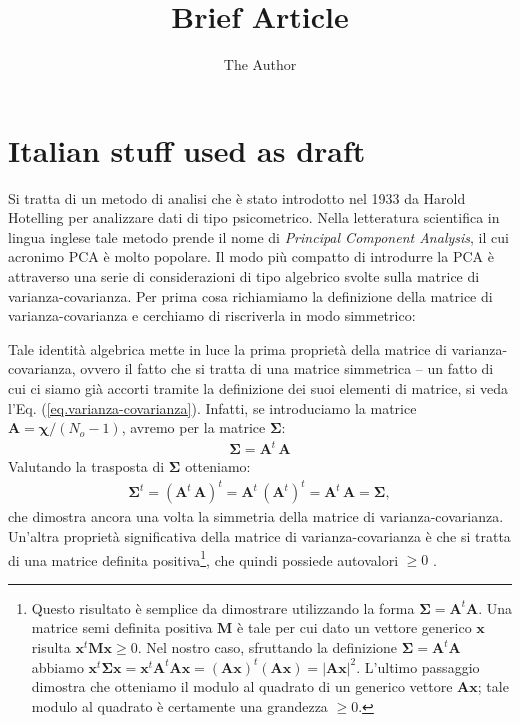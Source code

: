 \documentclass[11pt]{amsart}
\title{Brief Article}
\author{The Author}
\date{}                                           %
\begin{document}
\maketitle


\section{Italian stuff used as draft}
%
Si tratta di un metodo di analisi che è stato introdotto nel 1933 da Harold Hotelling \cite{Hotelling1933} per analizzare dati di tipo psicometrico. Nella letteratura scientifica in lingua inglese tale metodo prende il nome di {\em Principal Component Analysis}, il cui acronimo PCA è molto popolare. Il modo più compatto di introdurre la PCA è attraverso una serie di considerazioni di tipo algebrico svolte sulla matrice di varianza-covarianza.
%
Per prima cosa richiamiamo la definizione della matrice di varianza-covarianza e cerchiamo di riscriverla in modo simmetrico:

%
Tale identità algebrica mette in luce la prima proprietà della matrice di varianza-covarianza, ovvero il fatto che si tratta di una matrice simmetrica  -- un fatto di cui ci siamo già accorti tramite la definizione dei suoi elementi di matrice, si veda l'Eq. (\ref{eq.varianza-covarianza}). 
%
Infatti, se introduciamo la matrice $\bm A = \bm \chi / (N_o-1)$, avremo per la matrice $\bm \Sigma$:
%
\begin{eqnarray}
\label{eq.definizione-covarianza}
\bm \Sigma = \bm A^t \, \bm A
\end{eqnarray}
%
Valutando la trasposta di $\bm \Sigma$ otteniamo:
%
\begin{eqnarray}
\bm \Sigma^t = (\bm A^t \, \bm A)^t = \bm A^t \, (\bm A^t)^t = \bm A^t \, \bm A = \bm \Sigma,
\end{eqnarray}
%
che dimostra ancora una volta la simmetria della matrice di varianza-covarianza.
%
Un'altra proprietà significativa della matrice di varianza-covarianza è che si tratta di una matrice definita positiva\footnote{Questo risultato è semplice da dimostrare utilizzando la forma $\bm \Sigma = \bm A^t \bm A$. Una matrice semi definita positiva $\bm M$ è tale per cui dato un vettore generico $\bm x$ risulta $\bm x^t \bm M \bm x \ge 0$. Nel nostro caso, sfruttando la definizione $\bm \Sigma = \bm A^t \bm A$ abbiamo $\bm x^t \bm \Sigma \bm x = \bm x^t \bm A^t \bm A \bm x = (\bm A \bm x)^t (\bm A \bm x) = \left| \bm A \bm x \right|^2$. L'ultimo passaggio dimostra che otteniamo il modulo al quadrato di un generico vettore $\bm A \bm x$; tale modulo al quadrato è certamente una grandezza $\ge 0$.}, che quindi possiede autovalori $\ge 0$ \cite{Schott2016}.
%
\end{document}
